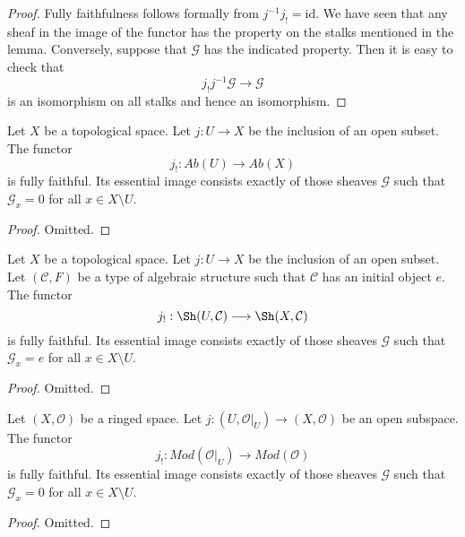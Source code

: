 \begin{proof}
Fully faithfulness follows formally from $j^{-1} j_! = \text{id}$.
We have seen that any sheaf in the image of the functor has
the property on the stalks mentioned in the lemma. Conversely, suppose
that $\mathcal{G}$ has the indicated property.
Then it is easy to check that
$$
j_! j^{-1} \mathcal{G} \to \mathcal{G}
$$
is an isomorphism on all stalks and hence an isomorphism.
\end{proof}

\begin{lemma}
\label{lemma-equivalence-categories-open-abelian}
Let $X$ be a topological space.
Let $j : U \to X$ be the inclusion of an open subset.
The functor
$$
j_! : \textit{Ab}(U) \longrightarrow \textit{Ab}(X)
$$
is fully faithful. Its essential image consists exactly
of those sheaves $\mathcal{G}$ such that
$\mathcal{G}_x = 0$ for all $x \in X \setminus U$.
\end{lemma}

\begin{proof}
Omitted.
\end{proof}

\begin{lemma}
\label{lemma-equivalence-categories-open-structures}
Let $X$ be a topological space.
Let $j : U \to X$ be the inclusion of an open subset.
Let $(\mathcal{C}, F)$ be a type of algebraic structure
such that $\mathcal{C}$ has an initial object $e$.
The functor
$$
j_! : \Sh(U, \mathcal{C}) \longrightarrow \Sh(X, \mathcal{C})
$$
is fully faithful. Its essential image consists exactly
of those sheaves $\mathcal{G}$ such that
$\mathcal{G}_x = e$ for all $x \in X \setminus U$.
\end{lemma}

\begin{proof}
Omitted.
\end{proof}


\begin{lemma}
\label{lemma-equivalence-categories-open-modules}
Let $(X, \mathcal{O})$ be a ringed space.
Let $j : (U, \mathcal{O}|_U) \to (X, \mathcal{O})$
be an open subspace.
The functor
$$
j_! : \textit{Mod}(\mathcal{O}|_U) \longrightarrow \textit{Mod}(\mathcal{O})
$$
is fully faithful. Its essential image consists exactly
of those sheaves $\mathcal{G}$ such that
$\mathcal{G}_x = 0$ for all $x \in X \setminus U$.
\end{lemma}

\begin{proof}
Omitted.
\end{proof}

